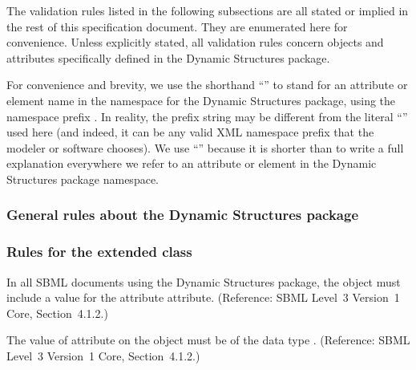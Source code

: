 The validation rules listed in the following subsections are all stated
or implied in the rest of this specification document.  They are
enumerated here for convenience. Unless explicitly stated, all
validation rules concern objects and attributes specifically defined in
the Dynamic Structures package.

For \notice convenience and brevity, we use the shorthand
``'' to stand for an attribute or element name 
in the namespace for the Dynamic Structures package, using
the namespace prefix .  In reality, the prefix string may be
different from the literal ``'' used here (and indeed, it
can be any valid XML namespace prefix that the modeler or software
chooses).  We use ``'' because it is shorter than to
write a full explanation everywhere we refer to an attribute or element
in the Dynamic Structures package namespace.

\subsubsection*{General rules about the Dynamic Structures package}
  

\subsubsection*{Rules for the extended  class} 
 {In all SBML documents using the Dynamic Structures package, the \SBML object must include a value for  the attribute  attribute.  (Reference: SBML Level~3 Version~1 Core, Section~4.1.2.)}
  
 {The value of attribute  on
  the \SBML object must be of the data type .
  (Reference: SBML Level~3 Version~1 Core, Section~4.1.2.) }
  

